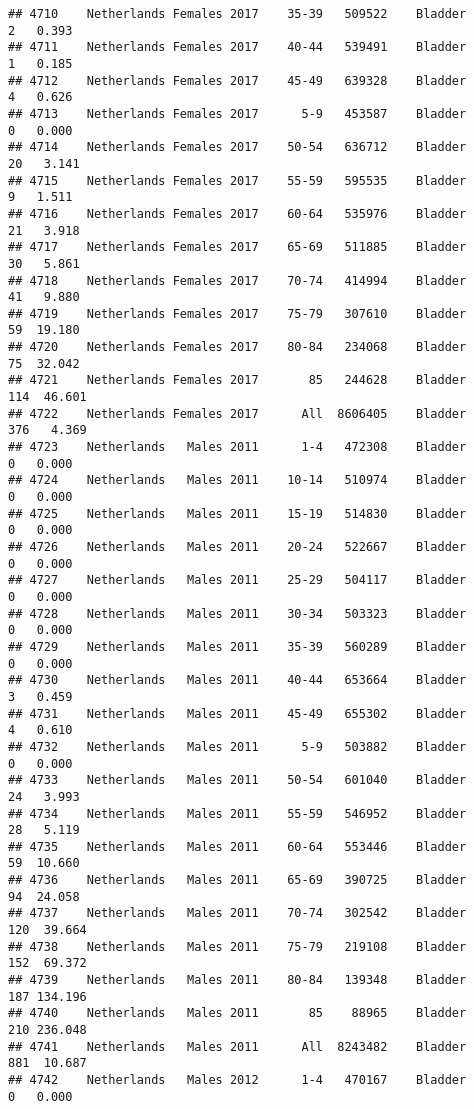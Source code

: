 \documentclass[
]{article}
\begin{document}
\begin{verbatim}
## 4710    Netherlands Females 2017    35-39   509522    Bladder      2   0.393
## 4711    Netherlands Females 2017    40-44   539491    Bladder      1   0.185
## 4712    Netherlands Females 2017    45-49   639328    Bladder      4   0.626
## 4713    Netherlands Females 2017      5-9   453587    Bladder      0   0.000
## 4714    Netherlands Females 2017    50-54   636712    Bladder     20   3.141
## 4715    Netherlands Females 2017    55-59   595535    Bladder      9   1.511
## 4716    Netherlands Females 2017    60-64   535976    Bladder     21   3.918
## 4717    Netherlands Females 2017    65-69   511885    Bladder     30   5.861
## 4718    Netherlands Females 2017    70-74   414994    Bladder     41   9.880
## 4719    Netherlands Females 2017    75-79   307610    Bladder     59  19.180
## 4720    Netherlands Females 2017    80-84   234068    Bladder     75  32.042
## 4721    Netherlands Females 2017       85   244628    Bladder    114  46.601
## 4722    Netherlands Females 2017      All  8606405    Bladder    376   4.369
## 4723    Netherlands   Males 2011      1-4   472308    Bladder      0   0.000
## 4724    Netherlands   Males 2011    10-14   510974    Bladder      0   0.000
## 4725    Netherlands   Males 2011    15-19   514830    Bladder      0   0.000
## 4726    Netherlands   Males 2011    20-24   522667    Bladder      0   0.000
## 4727    Netherlands   Males 2011    25-29   504117    Bladder      0   0.000
## 4728    Netherlands   Males 2011    30-34   503323    Bladder      0   0.000
## 4729    Netherlands   Males 2011    35-39   560289    Bladder      0   0.000
## 4730    Netherlands   Males 2011    40-44   653664    Bladder      3   0.459
## 4731    Netherlands   Males 2011    45-49   655302    Bladder      4   0.610
## 4732    Netherlands   Males 2011      5-9   503882    Bladder      0   0.000
## 4733    Netherlands   Males 2011    50-54   601040    Bladder     24   3.993
## 4734    Netherlands   Males 2011    55-59   546952    Bladder     28   5.119
## 4735    Netherlands   Males 2011    60-64   553446    Bladder     59  10.660
## 4736    Netherlands   Males 2011    65-69   390725    Bladder     94  24.058
## 4737    Netherlands   Males 2011    70-74   302542    Bladder    120  39.664
## 4738    Netherlands   Males 2011    75-79   219108    Bladder    152  69.372
## 4739    Netherlands   Males 2011    80-84   139348    Bladder    187 134.196
## 4740    Netherlands   Males 2011       85    88965    Bladder    210 236.048
## 4741    Netherlands   Males 2011      All  8243482    Bladder    881  10.687
## 4742    Netherlands   Males 2012      1-4   470167    Bladder      0   0.000

\end{verbatim}
\end{document}
